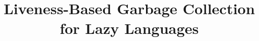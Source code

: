 \documentclass{sig-alternate}
\begin{document}

\title{Liveness-Based Garbage Collection for Lazy Languages}

%
%
%
%
%
\end{document}
